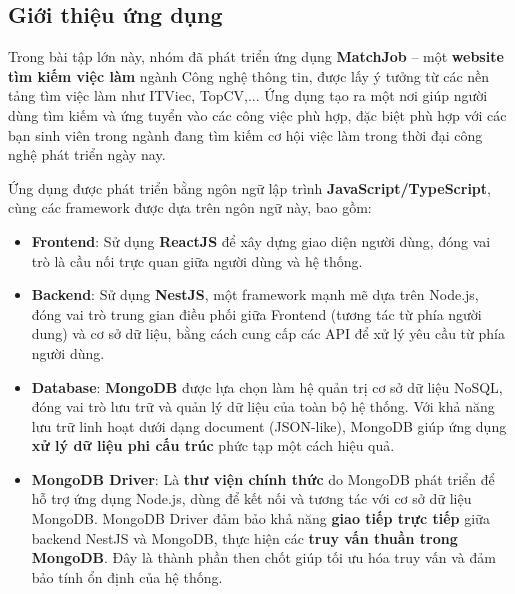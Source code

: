 \subsection{Giới thiệu ứng dụng}
Trong bài tập lớn này, nhóm đã phát triển ứng dụng \textbf{MatchJob} – một \textbf{website tìm kiếm việc làm} ngành Công nghệ thông tin, được lấy ý tưởng từ các nền tảng tìm việc làm  như ITViec, TopCV,... Ứng dụng tạo ra một nơi giúp người dùng tìm kiếm và ứng tuyển vào các công việc phù hợp, đặc biệt phù hợp với các bạn sinh viên trong ngành đang tìm kiếm cơ hội việc làm trong thời đại công nghệ phát triển ngày nay.

Ứng dụng được phát triển bằng ngôn ngữ lập trình \textbf{JavaScript/TypeScript}, cùng các framework được dựa trên ngôn ngữ này, bao gồm:

\begin{itemize}
    \item \textbf{Frontend}: Sử dụng \textbf{ReactJS} để xây dựng giao diện người dùng, đóng vai trò là cầu nối trực quan giữa người dùng và hệ thống.
    \item \textbf{Backend}: Sử dụng \textbf{NestJS}, một framework mạnh mẽ dựa trên Node.js, đóng vai trò trung gian điều phối giữa Frontend (tương tác từ phía người dung) và cơ sở dữ liệu, bằng cách cung cấp các API để xử lý yêu cầu từ phía người dùng.
    \item \textbf{Database}: \textbf{MongoDB} được lựa chọn làm hệ quản trị cơ sở dữ liệu NoSQL, đóng vai trò lưu trữ và quản lý dữ liệu của toàn bộ hệ thống. Với khả năng lưu trữ linh hoạt dưới dạng document (JSON-like), MongoDB giúp ứng dụng \textbf{xử lý dữ liệu phi cấu trúc} phức tạp một cách hiệu quả.
    \item \textbf{MongoDB Driver}: Là \textbf{thư viện chính thức} do MongoDB phát triển để hỗ trợ ứng dụng Node.js, dùng để kết nối và tương tác với cơ sở dữ liệu MongoDB. MongoDB Driver đảm bảo khả năng \textbf{giao tiếp trực tiếp} giữa backend NestJS và MongoDB, thực hiện các \textbf{truy vấn thuần trong MongoDB}. Đây là thành phần then chốt giúp tối ưu hóa truy vấn và đảm bảo tính ổn định của hệ thống.
\end{itemize}
